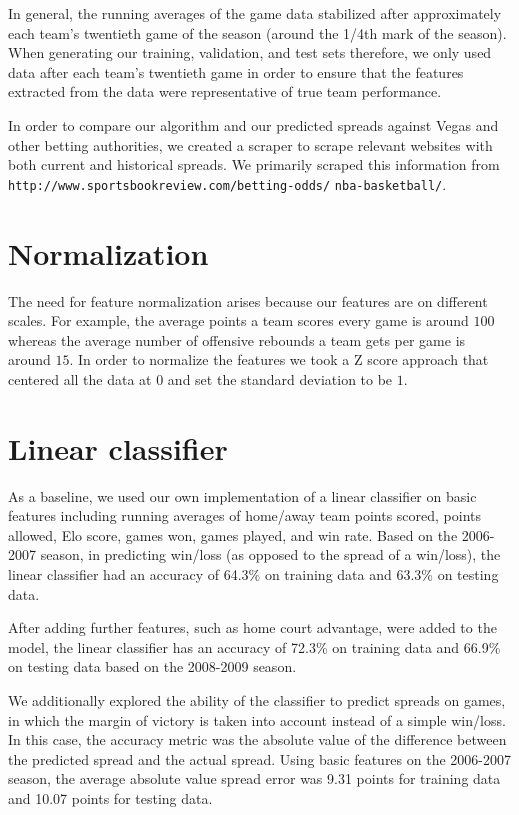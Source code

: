 \documentclass{article}
\begin{document}
In general, the running averages of the game data stabilized after approximately each team's twentieth game of the season (around the 1/4th mark of the season). When generating our training, validation, and test sets therefore, we only used data after each team's twentieth game in order to ensure that the features extracted from the data were representative of true team performance.

In order to compare our algorithm and our predicted spreads against Vegas and other betting authorities, we created a scraper to scrape relevant websites with both current and historical spreads. We primarily scraped this information from \texttt{http://www.sportsbookreview.com/betting-odds/} \texttt{nba-basketball/}.

\section{Normalization}
The need for feature normalization arises because our features are on different scales. For example, the average points a team scores every game is around $100$ whereas the average number of offensive rebounds a team gets per game is around $15$. In order to normalize the features we took a Z score approach that centered all the data at $0$ and set the standard deviation to be $1$.

\section{Linear classifier}
As a baseline, we used our own implementation of a linear classifier on basic features including running averages of home/away team points scored, points allowed, Elo score, games won, games played, and win rate. Based on the 2006-2007 season, in predicting win/loss (as opposed to the spread of a win/loss), the linear classifier had an accuracy of 64.3\% on training data and 63.3\% on testing data.

After adding further features, such as home court advantage, were added to the model, the linear classifier has an accuracy of 72.3\% on training data and 66.9\% on testing data based on the 2008-2009 season.

We additionally explored the ability of the classifier to predict spreads on games, in which the margin of victory is taken into account instead of a simple win/loss. In this case, the accuracy metric was the absolute value of the difference between the predicted spread and the actual spread. Using basic features on the 2006-2007 season, the average absolute value spread error was 9.31 points for training data and 10.07 points for testing data.
\end{document}
